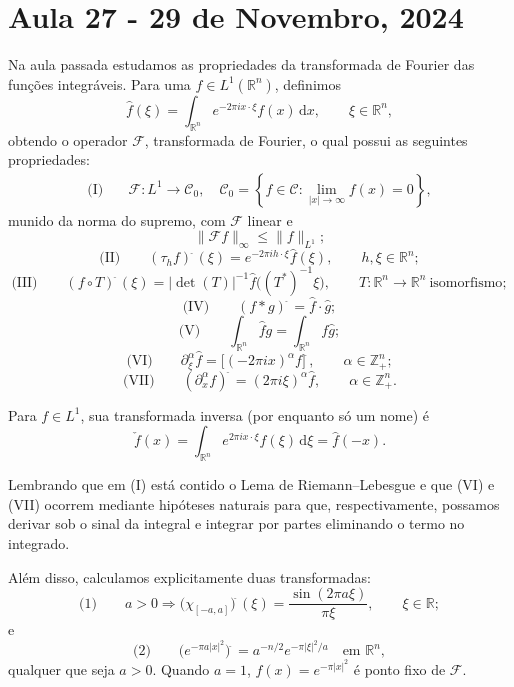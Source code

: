 \documentclass[../distribution_theory_notes.tex]{subfiles}
\begin{document}
\section{Aula 27 - 29 de Novembro, 2024}

Na aula passada estudamos as propriedades da transformada de Fourier das funções integráveis. Para uma \(f\in L^{1}(\mathbb{R}^{n})\), definimos
\[
	\hat{f}(\xi )=\int_{\mathbb{R}^{n}}e^{-2\pi i x\cdot \xi }f(x)\,\mathrm{d}x,
	\qquad \xi \in \mathbb{R}^{n},
\]
obtendo o operador \(\mathcal{F}\), transformada de Fourier, o qual possui as seguintes propriedades:
\begin{align*}
	\text{(I)}\quad & \mathcal{F}:L^{1}\longrightarrow \mathcal{C}_{0},
	\quad \mathcal{C}_{0}=\left\{f\in \mathcal{C}:\lim_{|x|\to \infty }f(x)=0\right\},
\end{align*}
munido da norma do supremo, com \(\mathcal{F}\) linear e
\[
	\|\mathcal{F}f\|_{\infty }\leq \|f\|_{L^{1}};
\]
\[
	\text{(II)}\qquad (\tau _{h}f)^{\widehat{\; }}(\xi )
	=e^{-2\pi i h\cdot \xi }\hat{f}(\xi ),
	\qquad h,\xi \in \mathbb{R}^{n};
\]
\[
	\text{(III)}\qquad (f\circ T)^{\widehat{\; }}(\xi )
	=|\det (T)|^{-1}\hat{f}\bigl((T^{*})^{-1}\xi \bigr),
	\qquad T:\mathbb{R}^{n}\longrightarrow \mathbb{R}^{n}\ \text{isomorfismo};
\]
\[
	\text{(IV)}\qquad (f*g)^{\widehat{\; }}=\hat{f}\cdot \hat{g};
\]
\[
	\text{(V)}\qquad \int_{\mathbb{R}^{n}}\hat{f}g
	=\int_{\mathbb{R}^{n}}f\hat{g};
\]
\[
	\text{(VI)}\qquad \partial _{\xi }^{\alpha }\hat{f}
	=\bigl[(-2\pi i x)^{\alpha }f\bigr]^{\widehat{\; }},
	\qquad \alpha \in \mathbb{Z}_{+}^{n};
\]
\[
	\text{(VII)}\qquad (\partial _{x}^{\alpha }f)^{\widehat{\; }}
	=(2\pi i\xi )^{\alpha }\hat{f},
	\qquad \alpha \in \mathbb{Z}_{+}^{n}.
\]

\begin{tcolorbox}[
		skin=enhanced,
		title=Observação,
		fonttitle=\bfseries,
		colframe=black,
		colbacktitle=cyan!75!white,
		colback=cyan!15,
		colbacklower=black,
		coltitle=black,
		drop fuzzy shadow
	]
	Para \(f\in L^{1}\), sua transformada inversa (por enquanto só um nome) é
	\[
		\check{f}(x)=\int_{\mathbb{R}^{n}}e^{2\pi i x\cdot \xi }f(\xi )\,\mathrm{d}\xi
		=\hat{f}(-x).
	\]
\end{tcolorbox}

Lembrando que em (I) está contido o Lema de Riemann--Lebesgue e que (VI) e (VII) ocorrem mediante hipóteses naturais para que, respectivamente, possamos derivar sob o sinal da integral e integrar por partes eliminando o termo no integrado.

Além disso, calculamos explicitamente duas transformadas:
\[
	\text{(1)}\qquad a>0\Longrightarrow
	\bigl(\chi _{[-a,a]}\bigr)^{\widehat{\; }}(\xi )
	=\frac{\sin (2\pi a\xi )}{\pi \xi },\qquad \xi \in \mathbb{R};
\]
e
\[
	\text{(2)}\qquad
	\bigl(e^{-\pi a|x|^{2}}\bigr)^{\widehat{\; }}
	=a^{-n/2}e^{-\pi |\xi |^{2}/a}
	\quad \text{em }\mathbb{R}^{n},
\]
qualquer que seja \(a>0\). Quando \(a=1\), \(f(x)=e^{-\pi |x|^{2}}\) é ponto fixo de \(\mathcal{F}\).
\end{document}
